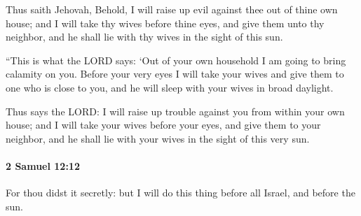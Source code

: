 			\begin{versebox}
					\item[BHS] 
					\item[ASV] Thus saith Jehovah, Behold, I will raise up evil against thee out of thine own house; and I will take thy wives before thine eyes, and give them unto thy neighbor, and he shall lie with thy wives in the sight of this sun.
					\item[NIV] “This is what the LORD says: ‘Out of your own household I am going to bring calamity on you. Before your very eyes I will take your wives and give them to one who is close to you, and he will sleep with your wives in broad daylight.
					\item[NRSV] Thus says the LORD: I will raise up trouble against you from within your own house; and I will take your wives before your eyes, and give them to your neighbor, and he shall lie with your wives in the sight of this very sun.
			\end{versebox}

		\paragraph{2 Samuel 12:12} %
			\label{2SAMUEL-12-12}

			For thou didst it secretly: but I will do this thing before all Israel, and before the sun.

